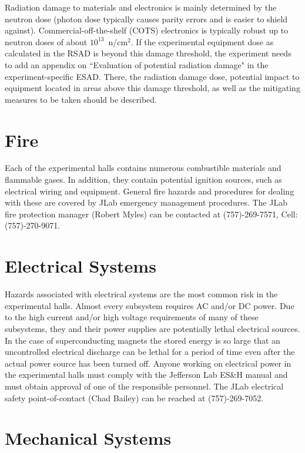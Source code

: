 \documentclass[12pt]{report}
\begin{document}
Radiation damage to materials and electronics is mainly determined by the neutron 
dose (photon dose typically causes parity errors and is easier to shield against). 
Commercial-off-the-shelf (COTS) electronics is typically robust up to neutron doses of 
about $10^{13}$~n/cm$^2$. If the experimental equipment dose as calculated in the RSAD 
is beyond this damage threshold, the experiment needs to add an appendix on ``Evaluation 
of potential radiation damage" in the experiment-specific ESAD. There, the radiation 
damage dose, potential impact to equipment located in areas above this damage threshold, 
as well as the mitigating measures to be taken should be described.

\section{Fire}

Each of the experimental halls contains numerous combustible materials and flammable gases. 
In addition, they contain potential ignition sources, such as electrical wiring and equipment. 
General fire hazards and procedures for dealing with these are covered by JLab emergency 
management procedures. The JLab fire protection manager (Robert Myles) can be contacted at 
(757)-269-7571, Cell: (757)-270-9071.

\section{Electrical Systems}

Hazards associated with electrical systems are the most common risk in the experimental 
halls. Almost every subsystem requires AC and/or DC power. Due to the high current and/or 
high voltage requirements of many of these subsystems, they and their power supplies are 
potentially lethal electrical sources. In the case of superconducting magnets the stored 
energy is so large that an uncontrolled electrical discharge can be lethal for a period of 
time even after the actual power source has been turned off. Anyone working on electrical 
power in the experimental halls must comply with the Jefferson Lab 
ES\&H manual and must obtain approval of one of the responsible personnel. The JLab 
electrical safety point-of-contact (Chad Bailey) can be reached at (757)-269-7052.

\section{Mechanical Systems}
\end{document}
